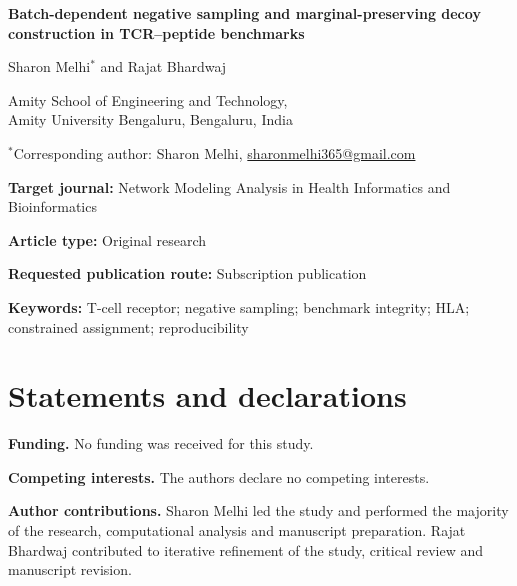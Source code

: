 \documentclass[11pt,a4paper]{article}
\begin{document}
\begin{center}
{\Large\bfseries Batch-dependent negative sampling and marginal-preserving decoy construction in TCR--peptide benchmarks}\par\vspace{14pt}
Sharon Melhi$^*$ and Rajat Bhardwaj\par
Amity School of Engineering and Technology,\\
Amity University Bengaluru, Bengaluru, India\par
$^*$Corresponding author: Sharon Melhi, \href{mailto:sharonmelhi365@gmail.com}{sharonmelhi365@gmail.com}
\end{center}
\vspace{12pt}
\textbf{Target journal:} Network Modeling Analysis in Health Informatics and Bioinformatics\par
\textbf{Article type:} Original research\par
\textbf{Requested publication route:} Subscription publication\par
\textbf{Keywords:} T-cell receptor; negative sampling; benchmark integrity; HLA; constrained assignment; reproducibility
\section*{Statements and declarations}
\textbf{Funding.} No funding was received for this study.

\textbf{Competing interests.} The authors declare no competing interests.

\textbf{Author contributions.} Sharon Melhi led the study and performed the majority of the research, computational analysis and manuscript preparation. Rajat Bhardwaj contributed to iterative refinement of the study, critical review and manuscript revision.
\end{document}
